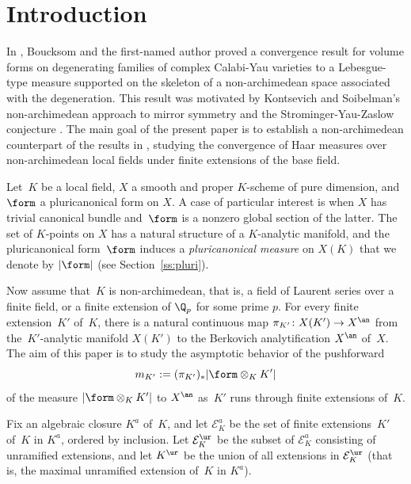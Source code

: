 \section{Introduction}\label{sec:intro}

In \cite{BJ}, Boucksom and the first-named author proved a convergence result for volume forms on degenerating families of complex Calabi-Yau varieties to a Lebesgue-type measure supported on the skeleton of a non-archimedean space associated with the degeneration. This result was motivated by Kontsevich and Soibelman's non-archimedean approach to mirror symmetry and the Strominger-Yau-Zaslow conjecture \cite{KS}. The main goal of the present paper is to establish a non-archimedean counterpart of the results in \cite{BJ}, studying the convergence of Haar measures over non-archimedean local fields under finite extensions of the base field.

Let~$K$ be a local field, $X$ a smooth and proper $K$\nobreakdash-scheme of pure dimension, and~$\form$ a pluricanonical form on $X$. A case of particular interest is when $X$ has trivial canonical bundle and~$\form$ is a nonzero global section of the latter. The set of $K$\nobreakdash-points on $X$ has a natural structure of a $K$\nobreakdash-analytic manifold, and the pluricanonical form~$\form$ induces a
{\em pluricanonical measure} on $X(K)$ that we denote by $|\form|$ (see Section~\ref{ss:pluri}).

Now assume that~$K$ is non-archimedean, that is, a field of Laurent series over a finite field, or a finite extension of $\Q_p$ for some prime $p$. For every finite extension~$K'$ of~$K$, there is a natural continuous map
$\pi_{K'}\colon X(K')\to X^{\an}$
from the~$K'$-analytic manifold $X(K')$ to the Berkovich analytification $X^{\an}$ of~$X$. The aim of this paper is to study the asymptotic behavior of the pushforward
\begin{equation*}
m_{K'}:=(\pi_{K'})_*|\form\otimes_K K'|
\end{equation*}
of the measure $|\form\otimes_K K'|$ to $X^{\an}$ as~$K'$ runs through
finite extensions of~$K$.

Fix an algebraic closure $K^a$ of~$K$, and let $\mathcal{E}^a_K$ be the set of finite extensions~$K'$ of~$K$ in $K^a$, ordered by inclusion.
Let $\mathcal{E}^{\ur}_K$ be the subset of $\mathcal{E}^a_K$
consisting of unramified extensions,
and let $K^{\ur}$ be the union of all extensions in $\mathcal{E}^{\ur}_K$ (that is, the maximal unramified extension of~$K$ in $K^a$).

